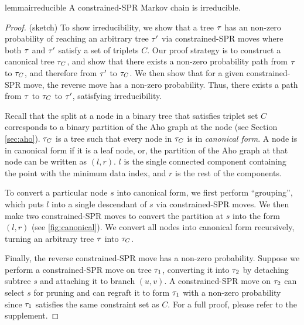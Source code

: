 \begin{restatable}{lemma}{irreducible}
\label{thm:irr}
A constrained-SPR Markov chain is irreducible.
\end{restatable}

\begin{proof}
(sketch) To show irreducibility,
we show that a tree $\tau$ has an non-zero
probability of reaching an arbitrary tree
$\tau'$ via constrained-SPR moves where
both $\tau$ and $\tau'$ satisfy a set of triplets $C$.
Our proof strategy
is to construct a canonical tree 
$\tau_C$, and show that there exists
a non-zero probability path from $\tau$ to $\tau_C$,
and therefore from $\tau'$ to $\tau_C$.
We then show that for a given constrained-SPR move,
the reverse move has a non-zero probability.
Thus, there exists a path from $\tau$ to $\tau_C$ to
$\tau'$, satisfying irreducibility.

Recall that the split at a node in a binary
tree that satisfies triplet set $C$
corresponds to a binary partition
of the Aho graph at the node (see Section \ref{sec:aho}).
$\tau_C$ is a tree such that
every node in $\tau_C$ is in \emph{canonical form}.
A node is in canonical form if it is a leaf node,
or, the partition of the Aho graph
at that node can be written as $(l, r)$.
$l$ is the single connected component
containing the point with the minimum data index,
and $r$ is the rest of the components.

To convert a particular node $s$ into canonical form,
we first perform ``grouping'',
which puts $l$ into a single descendant of $s$
via constrained-SPR moves.
We then make two constrained-SPR moves to convert
the partition at $s$ into the form $(l, r)$ (see \autoref{fig:canonical}).
We convert all nodes into canonical form recursively, turning 
an arbitrary tree $\tau$ into $\tau_C$.

Finally, the reverse constrained-SPR move has a non-zero
probability. Suppose
we perform a constrained-SPR move on tree $\tau_1$, converting it into $\tau_2$ by 
detaching subtree $s$
and attaching it to branch $(u, v)$.
A constrained-SPR move on $\tau_2$ can select
$s$ for pruning 
and can regraft it to form $\tau_1$ with a non-zero
probability since
$\tau_1$ satisfies the same constraint set as $C$.
For a full proof, please refer to the supplement.
\end{proof}

